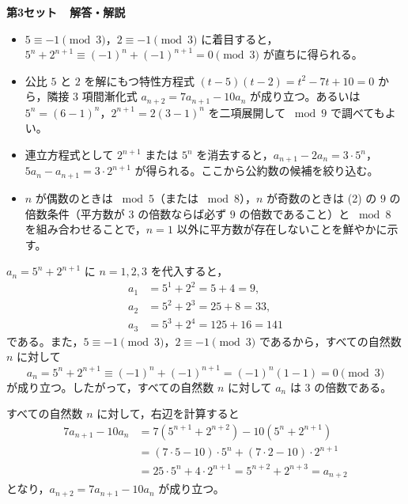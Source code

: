 
\noindent
{\Large\sffamily\bfseries 第3セット\ \ 解答・解説}
\par\vspace{2mm}


\begin{itemize}[leftmargin=1.6em,itemsep=2pt,topsep=2pt]
  \item[(1)] $5\equiv -1\pmod{3}$，$2\equiv -1\pmod{3}$ に着目すると，$5^{n}+2^{n+1}\equiv (-1)^{n}+(-1)^{n+1}=0\pmod{3}$ が直ちに得られる。
  \item[(2)] 公比 $5$ と $2$ を解にもつ特性方程式 $(t-5)(t-2)=t^{2}-7t+10=0$ から，隣接 $3$ 項間漸化式 $a_{n+2}=7a_{n+1}-10a_{n}$ が成り立つ。あるいは $5^{n}=(6-1)^{n}$，$2^{n+1}=2(3-1)^{n}$ を二項展開して $\bmod 9$ で調べてもよい。
  \item[(3)] 連立方程式として $2^{n+1}$ または $5^{n}$ を消去すると，$a_{n+1}-2a_{n}=3\cdot 5^{n}$，$5a_{n}-a_{n+1}=3\cdot 2^{n+1}$ が得られる。ここから公約数の候補を絞り込む。
  \item[(4)] $n$ が偶数のときは $\bmod 5$（または $\bmod 8$），$n$ が奇数のときは (2) の $9$ の倍数条件（平方数が $3$ の倍数ならば必ず $9$ の倍数であること）と $\bmod 8$ を組み合わせることで，$n=1$ 以外に平方数が存在しないことを鮮やかに示す。
\end{itemize}

$a_{n}=5^{n}+2^{n+1}$ に $n=1, 2, 3$ を代入すると，
\begin{align*}
  a_{1} &= 5^{1} + 2^{2} = 5 + 4 = 9,\\
  a_{2} &= 5^{2} + 2^{3} = 25 + 8 = 33,\\
  a_{3} &= 5^{3} + 2^{4} = 125 + 16 = 141
\end{align*}
である。また，$5\equiv -1\pmod{3}$，$2\equiv -1\pmod{3}$ であるから，すべての自然数 $n$ に対して
\[
  a_{n} = 5^{n} + 2^{n+1} \equiv (-1)^{n} + (-1)^{n+1} = (-1)^{n}(1-1) = 0 \pmod{3}
\]
が成り立つ。したがって，すべての自然数 $n$ に対して $a_{n}$ は $3$ の倍数である。


すべての自然数 $n$ に対して，右辺を計算すると
\begin{align*}
  7a_{n+1} - 10a_{n}
  &= 7\left(5^{n+1}+2^{n+2}\right) - 10\left(5^{n}+2^{n+1}\right) \\
  &= (7\cdot 5 - 10)\cdot 5^{n} + (7\cdot 2 - 10)\cdot 2^{n+1} \\
  &= 25\cdot 5^{n} + 4\cdot 2^{n+1} = 5^{n+2} + 2^{n+3} = a_{n+2}
\end{align*}
となり，$a_{n+2}=7a_{n+1}-10a_{n}$ が成り立つ。

